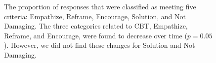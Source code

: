 \begin{figure}

\caption{The proportion of responses that were classified as meeting five criteria: Empathize, Reframe, Encourage, Solution, and Not Damaging. The three categories related to CBT, Empathize, Reframe, and Encourage, were found to decrease over time ($p=0.05$). However, we did not find these changes for Solution and Not Damaging. 
} 

\label{fig:SolutionsOverQueryNumber}
\end{figure}






















